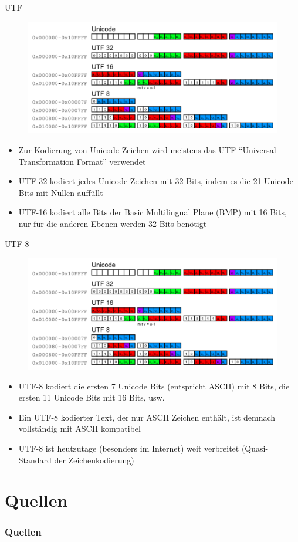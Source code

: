 \documentclass[12pt%
,xcolor=table
,aspectratio=169%
]{beamer}
\begin{document}
\begin{frame}{UTF}
\begin{figure}
\center
\includegraphics[scale=0.3]{pictures/utf}
\end{figure}
\begin{itemize}
	\item Zur Kodierung von Unicode-Zeichen wird meistens das UTF \enquote{Universal Transformation Format} verwendet
	\item UTF-32 kodiert jedes Unicode-Zeichen mit 32 Bits, indem es die 21 Unicode Bits mit Nullen auffüllt
	\item UTF-16 kodiert alle Bits der Basic Multilingual Plane (BMP) mit 16 Bits, nur für die anderen Ebenen werden 32 Bits benötigt
\end{itemize}
\end{frame}

\begin{frame}{UTF-8}
\begin{figure}
\center
\includegraphics[scale=0.3]{pictures/utf}
\end{figure}
\begin{itemize}
	\item UTF-8 kodiert die ersten 7 Unicode Bits (entspricht ASCII) mit 8 Bits, die ersten 11 Unicode Bits mit 16 Bits, usw.
	\item Ein UTF-8 kodierter Text, der nur ASCII Zeichen enthält, ist demnach vollständig mit ASCII kompatibel
    \item UTF-8 ist heutzutage (besonders im Internet) weit verbreitet (Quasi-Standard der Zeichenkodierung)

\end{itemize}
\end{frame}



\section*{Quellen}
\appendix
\begin{frame}[allowframebreaks]
  \frametitle<presentation>{Quellen}
\printbibliography
\end{frame}
\end{document}
